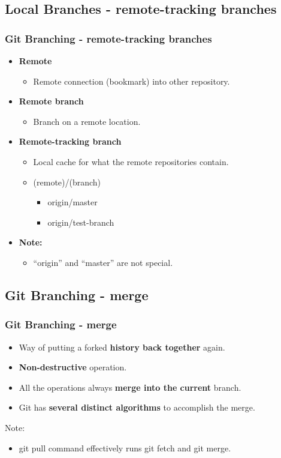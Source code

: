 \subsection[]{Local Branches - remote-tracking branches}
\begin{frame}
\frametitle{Git Branching - remote-tracking branches}
\begin{itemize}
	\item \textbf{Remote}
		\begin{itemize}
		\item Remote connection (bookmark) into other repository.
		\end{itemize}
	\item \textbf{Remote branch}
		\begin{itemize}
		\item Branch on a remote location.
		\end{itemize}
	\item \textbf{Remote-tracking branch}
		\begin{itemize}
		\item Local cache for what the remote repositories contain.
		\item (remote)/(branch)
			\begin{itemize}
			\item origin/master
			\item origin/test-branch
			\end{itemize}
		\end{itemize}
	\item \textbf{Note:}
		\begin{itemize}
		\item “origin” and “master” are not special.
		\end{itemize}
\end{itemize}
\end{frame}

\subsection[]{Git Branching - merge}
\begin{frame}
\frametitle{Git Branching - merge}
\begin{itemize}
	\item Way of putting a forked \textbf{history back together} again.
	\item\textbf{Non-destructive} operation.
	\item All the operations always \textbf{merge into the current} branch.
	\item Git has \textbf{several distinct algorithms} to accomplish the merge.
\end{itemize}
Note:
\begin{itemize}
	\item git pull command effectively runs git fetch and git merge.
\end{itemize}
\end{frame}

